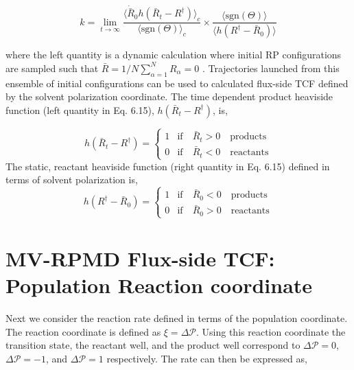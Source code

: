 \documentclass[phd,tocprelim]{cornell}
\begin{document}
\begin{equation}
 k=\lim_{t \to \infty}\frac{\langle \dot{\bar{R}}_0 h(\bar{R}_t -R^{\dagger}) \rangle_c}{\langle \textrm{sgn}(\Theta)\rangle_c} \times \frac{\langle \textrm{sgn}(\Theta)\rangle}{\langle h(R^{\dagger} -\bar{R}_0)\rangle} 
\end{equation}

where the left quantity is a dynamic calculation where initial RP configurations are sampled such that $\bar{R} = 1/N\sum_{\alpha=1}^{N} R_{\alpha}=0$ . Trajectories launched from this ensemble of initial configurations can be used to calculated flux-side TCF  defined by the solvent polarization coordinate. The time dependent product heaviside function (left quantity in Eq. 6.15),  $h(\bar{R}_t -R^{\dagger})$,  is, 

\begin{equation}
  h(\bar{R}_t -R^{\dagger})=\left\{
     \begin{array}{ll}
     1 & \textrm{if} \quad \bar{R}_t>0 \quad \textrm{products}\\
     0 &  \textrm{if} \quad  \bar{R}_t<0 \quad \textrm{reactants}
    \end{array}\right.
    \label{eq:hs}
\end{equation}
The static, reactant heaviside function (right quantity in Eq. 6.15) defined in terms of solvent polarization is, 
\begin{equation}
h(R^{\dagger} -\bar{R}_0)=\left\{
     \begin{array}{ll}
     1 & \textrm{if} \quad \bar{R}_0<0 \quad \textrm{products}\\
     0 &  \textrm{if} \quad  \bar{R}_0>0 \quad \textrm{reactants}
    \end{array}\right.
    \label{eq:hs}
\end{equation}


\section{MV-RPMD Flux-side TCF: Population Reaction coordinate}
Next we consider the reaction rate defined in terms of the population coordinate. The reaction coordinate  is defined as $\xi = \Delta \mathcal{P}$. Using this reaction coordinate the transition state, the reactant well, and the product well correspond to $\Delta \mathcal{P}=0$, $\Delta \mathcal{P}=-1$, and $\Delta \mathcal{P}=1$ respectively. The rate can then be expressed as,
\end{document}
